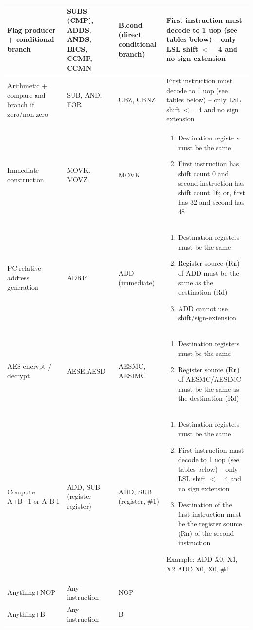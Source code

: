 \documentclass{article}
\begin{document}
\begin{longtable}{|p{2in}|p{1in}|p{1in}|p{2in}|}
Flag producer + conditional branch & SUBS (CMP), ADDS, ANDS, BICS, CCMP, CCMN & B.cond (direct conditional branch) & First instruction must decode to 1 uop (see tables below) – only LSL shift $<$= 4 and no sign extension \\ \hline
Arithmetic + compare and branch if zero/non-zero & SUB, AND, EOR & CBZ, CBNZ & First instruction must decode to 1 uop (see tables below) – only LSL shift $<$= 4 and no sign extension \\ \hline
Immediate construction & MOVK, MOVZ  & MOVK &
\parbox{2in}{
\begin{enumerate}
\item Destination registers must be the same 
\item First instruction has shift count 0 and second instruction has shift count 16; or, first has 32 and second has 48
\end{enumerate}} \\ \hline
PC-relative address generation & ADRP & ADD (immediate) &
\parbox{2in}{
  \begin{enumerate} \item Destination registers must be the same
\item Register source (Rn) of ADD must be the same as the destination (Rd)
\item ADD cannot use shift/sign-extension
\end{enumerate}} \\ \hline
AES encrypt / decrypt & AESE,AESD & AESMC, AESIMC &
\parbox{2in}{
\begin{enumerate} \item Destination registers must be the same
\item Register source (Rn) of AESMC/AESIMC must be the same as the destination (Rd)
\end{enumerate}} \\ \hline
Compute A+B+1 or A-B-1 & ADD, SUB (register-register) & ADD, SUB (register, \#1) &
\parbox{2in}{
\begin{enumerate}
\item Destination registers must be the same
\item First instruction must decode to 1 uop (see tables below) – only LSL shift $<$= 4 and no sign extension
\item Destination of the first instruction must be the register source (Rn) of the second instruction
\end{enumerate}
Example: \\
ADD X0, X1, X2\\
ADD X0, X0, \#1}
\\ \hline
Anything+NOP & Any instruction & NOP  & \\  \hline
Anything+B & Any instruction & B & \\ 
\hline
\end{longtable}
\end{document}
